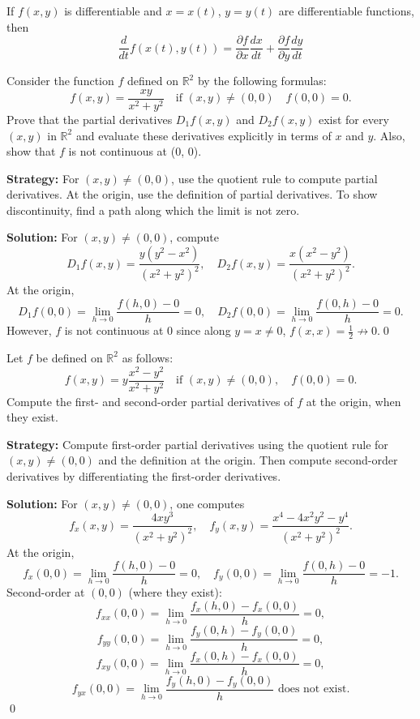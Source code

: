 \begin{theorem}
If $f(x,y)$ is differentiable and $x = x(t)$, $y = y(t)$ are differentiable functions, then
\[ \frac{d}{dt}f(x(t), y(t)) = \frac{\partial f}{\partial x}\frac{dx}{dt} + \frac{\partial f}{\partial y}\frac{dy}{dt} \]
\end{theorem}

\begin{problembox}
Consider the function \( f \) defined on \( \mathbb{R}^2 \) by the following formulas:
\[ f(x, y) = \frac{xy}{x^2 + y^2} \quad \text{if } (x, y) \neq (0, 0) \quad f(0, 0) = 0. \]
Prove that the partial derivatives \( D_1 f(x, y) \) and \( D_2 f(x, y) \) exist for every \( (x, y) \) in \( \mathbb{R}^2 \) and evaluate these derivatives explicitly in terms of \( x \) and \( y \). Also, show that \( f \) is not continuous at (0, 0).
\end{problembox}

\noindent\textbf{Strategy:} For \( (x, y) \neq (0, 0) \), use the quotient rule to compute partial derivatives. At the origin, use the definition of partial derivatives. To show discontinuity, find a path along which the limit is not zero.

\bigskip\noindent\textbf{Solution:}
For $(x,y)\ne(0,0)$, compute
\[D_1f(x,y)=\frac{y(y^2-x^2)}{(x^2+y^2)^2},\quad D_2f(x,y)=\frac{x(x^2-y^2)}{(x^2+y^2)^2}.\]
At the origin,
\[D_1f(0,0)=\lim_{h\to 0}\frac{f(h,0)-0}{h}=0,\quad D_2f(0,0)=\lim_{h\to 0}\frac{f(0,h)-0}{h}=0.\]
However, $f$ is not continuous at $0$ since along $y=x\ne 0$, $f(x,x)=\tfrac12\not\to 0$.\qed


\begin{problembox}
Let \( f \) be defined on \( \mathbb{R}^2 \) as follows:
\[ f(x, y) = y \frac{x^2 - y^2}{x^2 + y^2} \quad \text{if } (x, y) \neq (0, 0), \quad f(0, 0) = 0. \]
Compute the first- and second-order partial derivatives of \( f \) at the origin, when they exist.
\end{problembox}

\noindent\textbf{Strategy:} Compute first-order partial derivatives using the quotient rule for \( (x, y) \neq (0, 0) \) and the definition at the origin. Then compute second-order derivatives by differentiating the first-order derivatives.

\bigskip\noindent\textbf{Solution:}
For $(x,y)\ne(0,0)$, one computes
\[f_x(x,y)=\frac{4xy^3}{(x^2+y^2)^2},\quad f_y(x,y)=\frac{x^4-4x^2y^2-y^4}{(x^2+y^2)^2}.\]
At the origin,
\[f_x(0,0)=\lim_{h\to 0}\frac{f(h,0)-0}{h}=0,\quad f_y(0,0)=\lim_{h\to 0}\frac{f(0,h)-0}{h}=-1.\]
Second-order at $(0,0)$ (where they exist):
\[f_{xx}(0,0)=\lim_{h\to 0}\frac{f_x(h,0)-f_x(0,0)}{h}=0,\] 
\[f_{yy}(0,0)=\lim_{h\to 0}\frac{f_y(0,h)-f_y(0,0)}{h}=0,\]
\[f_{xy}(0,0)=\lim_{h\to 0}\frac{f_x(0,h)-f_x(0,0)}{h}=0,\]
\[f_{yx}(0,0)=\lim_{h\to 0}\frac{f_y(h,0)-f_y(0,0)}{h}\text{ does not exist}.\]\qed


